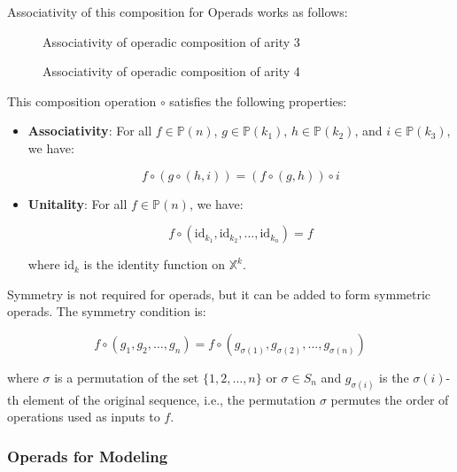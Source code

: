 Associativity of this composition for Operads works as follows:

\begin{figure}[h]
\centering
    
    \caption{Associativity of operadic composition of arity 3}
\end{figure}

\begin{figure}[h]
\centering

\caption{Associativity of operadic composition of arity 4}
\label{fig:arity-4-associativity}
\end{figure}

This composition operation $\circ$ satisfies the following properties:

\begin{itemize}
  \item \textbf{Associativity}: For all $f \in \mathbb{P}(n)$, $g \in \mathbb{P}(k_1)$, $h \in \mathbb{P}(k_2)$, and $i \in \mathbb{P}(k_3)$, we have:

  \begin{equation}
    f \circ (g \circ (h, i)) = (f \circ (g, h)) \circ i
  \end{equation}

  \item \textbf{Unitality}: For all $f \in \mathbb{P}(n)$, we have:

  \begin{equation}
    f \circ (\text{id}_{k_1}, \text{id}_{k_2}, \ldots, \text{id}_{k_n}) = f
  \end{equation}

  where $\text{id}_k$ is the identity function on $\mathbb{X}^k$.
\end{itemize}

Symmetry is not required for operads, but it can be added to form symmetric operads. The symmetry condition is:

\begin{equation}
  f \circ (g_1, g_2, \ldots, g_n) = f \circ (g_{\sigma(1)}, g_{\sigma(2)}, \ldots, g_{\sigma(n)})
\end{equation}

where $\sigma$ is a permutation of the set $\{1, 2, \ldots, n\}$ or $\sigma \in S_n$ and $g_{\sigma(i)}$ is the $\sigma(i)$-th element of the original sequence, i.e., the permutation $\sigma$ permutes the order of operations used as inputs to $f$.

\subsubsection{Operads for Modeling}

